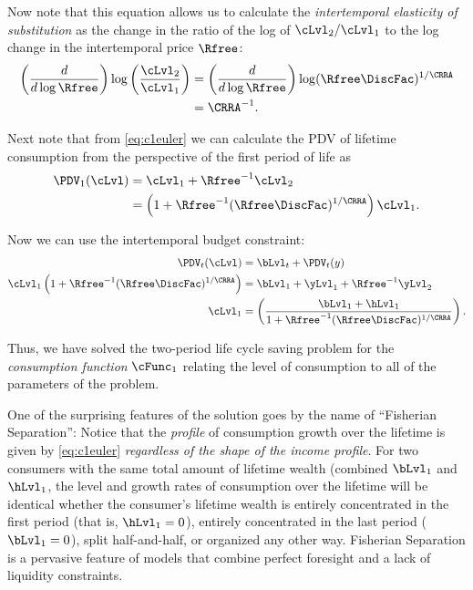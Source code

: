 \documentclass{scrartcl}
\begin{document}
  Now note that this equation allows us to calculate the \textit{intertemporal elasticity of substitution} as the change in the ratio of the log of $\cLvl_{2}/\cLvl_{1}$ to the log change in the intertemporal price $\Rfree$:
  \begin{equation}\begin{gathered}\begin{aligned} \left(\frac{d}{d \log \Rfree}\right) \log \left(\frac{\cLvl_{2}}{\cLvl_{1}}\right) & = \left(\frac{d}{d \log \Rfree}\right) \log (\Rfree \DiscFac)^{1/\CRRA} \\ & = \CRRA^{-1}.
      \end{aligned}\end{gathered}\end{equation}

  Next note that from \eqref{eq:c1euler} we can calculate the PDV of lifetime consumption from the perspective of the first period of life as
  \begin{equation}\begin{gathered}\begin{aligned} \PDV_{1}(\cLvl) & = \cLvl_{1} + \Rfree^{-1}\cLvl_{2} \\ & = \left(1+\Rfree^{-1}(\Rfree\DiscFac)^{1/\CRRA}\right)\cLvl_{1}.
      \end{aligned}\end{gathered}\end{equation}

  Now we can use the intertemporal budget constraint:
  \begin{equation}\begin{gathered}\begin{aligned} \PDV_{t}(\cLvl) & = \bLvl_{t}+\PDV_{t}(y) \\ \cLvl_{1}\left(1+\Rfree^{-1}(\Rfree\DiscFac)^{1/\CRRA}\right) & = \bLvl_{1}+\yLvl_{1}+\Rfree^{-1}\yLvl_{2} \\ \cLvl_{1} & = \left(\frac{\bLvl_{1}+\hLvl_{1}}{1+\Rfree^{-1}(\Rfree\DiscFac)^{1/\CRRA}}\right).
      \end{aligned}\end{gathered}\end{equation}

  Thus, we have solved the two-period life cycle saving problem for the \textit{consumption function} $\cFunc_{1}$ relating the level of consumption to all of the parameters of the problem.

  One of the surprising features of the solution goes by the name of ``Fisherian Separation'': Notice that the \textit{profile} of consumption growth over the lifetime is given by \eqref{eq:c1euler} \textit{regardless of the shape of the income profile}.
  For two consumers with the same total amount of lifetime wealth (combined $\bLvl_{1}$ and $\hLvl_{1}$, the level and growth rates of consumption over the lifetime will be identical whether the consumer's lifetime wealth is entirely concentrated in the first period (that is, $\hLvl_{1}=0$), entirely concentrated in the last period ($\bLvl_{1}=0$), split half-and-half, or organized any other way.
  Fisherian Separation is a pervasive feature of models that combine perfect foresight and a lack of liquidity constraints.
\end{document}

